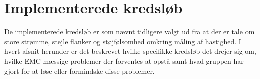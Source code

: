 \chapter{Implementerede kredsløb}

De implementerede kredsløb er som nævnt tidligere valgt ud fra at der er tale om store strømme, stejle flanker og støjfølsomhed omkring måling af hastighed. 
I hvert afsnit herunder er det beskrevet hvilke specifikke kredsløb det drejer sig om, hvilke EMC-mæssige problemer der forventes at opstå samt hvad gruppen har gjort for at løse eller formindske disse problemer.



